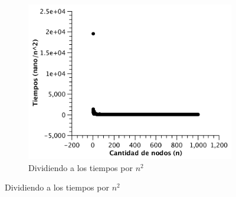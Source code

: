 \begin{figure}[H]
        \centering
        \begin{subfigure}[b]{0.5\textwidth}
                \includegraphics[width=\textwidth]{imagenes/vacio-matriz-3.pdf}
                \caption{Dividiendo a los tiempos por $n^2$}
        \end{subfigure}


\end{figure}
